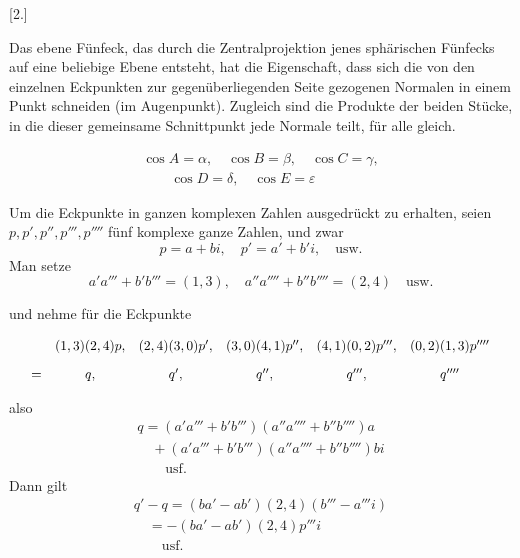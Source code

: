 \begingroup
\renewcommand{\arraystretch}{1.45}
\fancyhead[L]{}
\par\medskip{}\centerline{[2.]}\nobreak\smallskip
Das ebene Fünfeck, das durch die Zentralprojektion jenes sphärischen Fünfecks auf eine beliebige Ebene entsteht, hat die Eigenschaft, dass sich die von den einzelnen Eckpunkten zur gegenüberliegenden Seite gezogenen Normalen in einem Punkt schneiden (im Augenpunkt). Zugleich sind die Produkte der beiden Stücke, in die dieser gemeinsame Schnittpunkt jede Normale teilt, für alle gleich.

\providecommand{\EqOverGt}{\mathrel{\substack{=\\>}}}


\begin{center}
\resizebox{.60\linewidth}{!}{}
\end{center}
\[
\begin{gathered}\cos A=\alpha,\quad \cos B=\beta,\quad \cos C=\gamma,\\[9pt]\quad{}\quad \cos D=\delta,\quad \cos E=\varepsilon\end{gathered}
\]

Um die Eckpunkte in ganzen komplexen Zahlen ausgedrückt zu erhalten,
seien $p,p',p'',p''',p''''$ fünf komplexe ganze Zahlen, und zwar
\[
p=a+bi,\quad p'=a'+b'i,\quad\text{usw.}
\]
Man setze
\[
a'a'''+b'b'''=(1,3),\quad a''a''''+b''b''''=(2,4)\quad\text{usw.}
\]

und nehme für die Eckpunkte
\par\nopagebreak%
\begingroup\small\setlength{\arraycolsep}{2pt}\[
\resizebox{.98\linewidth}{!}{$\displaystyle \begin{array}{rccccc} & (1,3)(2,4)p, & (2,4)(3,0)p', & (3,0)(4,1)p'', & (4,1)(0,2)p''', & (0,2)(1,3)p''''\\[9pt] = & q, & q', & q'', & q''', & q'''' \end{array}$}
\]\endgroup\par%

also
\[
\begin{gathered} q=(a'a'''+b'b''')(a''a''''+b''b'''')a \\[9pt]\quad{}+(a'a'''+b'b''')(a''a''''+b''b'''')bi\\[9pt] \qquad\text{usf.} \end{gathered}
\]
Dann gilt
\[
\begin{gathered} q'-q=(ba'-ab')(2,4)(b'''-a'''i)\\[9pt]\quad{}=-(ba'-ab')(2,4)p'''i\\[9pt] \qquad\text{usf.} \end{gathered}
\]




